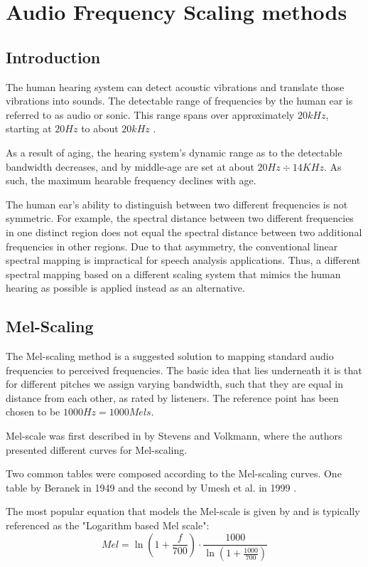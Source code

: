 \chapter{Audio Frequency Scaling methods}\label{ch:scaling_methods}
\section{Introduction}
The human hearing system can detect 
acoustic vibrations and translate 
those vibrations into sounds.
The detectable range of frequencies by the human ear
is referred to as audio or sonic. This range
spans over approximately \(20kHz\),
starting at \(20Hz\) to about \(20kHz\)
\cite{hearthres}.

As a result of aging, the hearing system's dynamic range 
as to the detectable bandwidth decreases,
and by middle-age are set at about
\(20Hz \div 14KHz\)\cite{Wiley2008ChangesIH}.
As such, the maximum hearable frequency
declines with age.

The human ear's ability to distinguish 
between two different frequencies 
is not symmetric. 
For example, the spectral distance between two 
different frequencies in one distinct region does 
not equal the spectral distance 
between two additional frequencies in other regions.
Due to that asymmetry, the conventional linear 
spectral mapping is impractical for
speech analysis applications.
Thus, a different spectral mapping 
based on a different scaling system
that mimics the human hearing as possible
is applied instead as an alternative.

\section{Mel-Scaling}
The Mel-scaling method 
is a suggested solution to mapping 
standard audio frequencies to perceived frequencies.
The basic idea that lies underneath it is that for
different pitches we assign varying bandwidth,
such that they are equal in distance
from each other, as rated by listeners.
The reference point has been chosen to be 
\(1000 Hz = 1000 Mels\).

Mel-scale was first described in \cite{Volkmann} by Stevens and Volkmann,
where the authors presented different curves for Mel-scaling.

Two common tables were composed
according to the Mel-scaling curves. One table by 
Beranek in 1949 \cite{beranek1988acoustical} 
and the second by Umesh et al. in 1999 \cite{fitmelscale}.

The most popular equation that models the Mel-scale
is given by \cite{o1987speech} and is typically referenced as
the "Logarithm based Mel scale":
\begin{equation}\label{eq:mel_1}
    Mel = \ln \left( 1 + \frac{f}{700} \right) \cdot \frac{1000}{\ln(1+\frac{1000}{700})} 
\end{equation}


